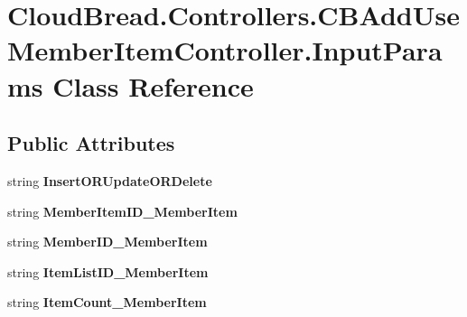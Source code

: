 \hypertarget{class_cloud_bread_1_1_controllers_1_1_c_b_add_use_member_item_controller_1_1_input_params}{}\section{Cloud\+Bread.\+Controllers.\+C\+B\+Add\+Use\+Member\+Item\+Controller.\+Input\+Params Class Reference}
\label{class_cloud_bread_1_1_controllers_1_1_c_b_add_use_member_item_controller_1_1_input_params}
\subsection*{Public Attributes}
\begin{DoxyCompactItemize}
\item 
string {\bfseries Insert\+O\+R\+Update\+O\+R\+Delete}\hypertarget{class_cloud_bread_1_1_controllers_1_1_c_b_add_use_member_item_controller_1_1_input_params_abb00a2bdfcedef7868d3e05a3b6743ff}{}\label{class_cloud_bread_1_1_controllers_1_1_c_b_add_use_member_item_controller_1_1_input_params_abb00a2bdfcedef7868d3e05a3b6743ff}

\item 
string {\bfseries Member\+Item\+I\+D\+\_\+\+Member\+Item}\hypertarget{class_cloud_bread_1_1_controllers_1_1_c_b_add_use_member_item_controller_1_1_input_params_aea9c50717f7a3871bea5eaa5c16ec828}{}\label{class_cloud_bread_1_1_controllers_1_1_c_b_add_use_member_item_controller_1_1_input_params_aea9c50717f7a3871bea5eaa5c16ec828}

\item 
string {\bfseries Member\+I\+D\+\_\+\+Member\+Item}\hypertarget{class_cloud_bread_1_1_controllers_1_1_c_b_add_use_member_item_controller_1_1_input_params_a8439d879f2e621357dda920f99bdcf94}{}\label{class_cloud_bread_1_1_controllers_1_1_c_b_add_use_member_item_controller_1_1_input_params_a8439d879f2e621357dda920f99bdcf94}

\item 
string {\bfseries Item\+List\+I\+D\+\_\+\+Member\+Item}\hypertarget{class_cloud_bread_1_1_controllers_1_1_c_b_add_use_member_item_controller_1_1_input_params_ae1d7bb334f5bdb4f61a6aaa5e93e2a40}{}\label{class_cloud_bread_1_1_controllers_1_1_c_b_add_use_member_item_controller_1_1_input_params_ae1d7bb334f5bdb4f61a6aaa5e93e2a40}

\item 
string {\bfseries Item\+Count\+\_\+\+Member\+Item}\hypertarget{class_cloud_bread_1_1_controllers_1_1_c_b_add_use_member_item_controller_1_1_input_params_aaf2f3d738a6cec7b084795bde15ae251}{}\label{class_cloud_bread_1_1_controllers_1_1_c_b_add_use_member_item_controller_1_1_input_params_aaf2f3d738a6cec7b084795bde15ae251}


\end{DoxyCompactItemize}
